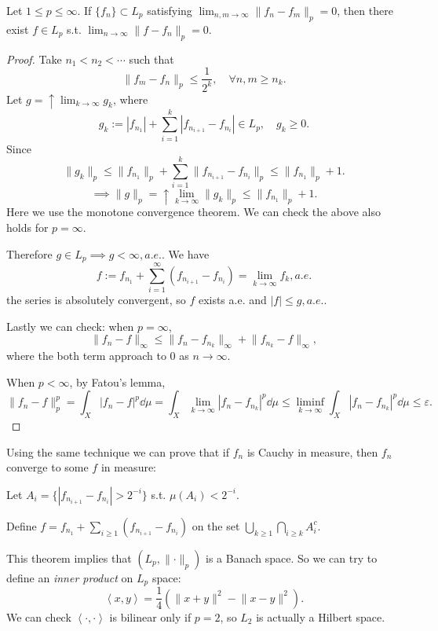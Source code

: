 \begin{theorem}
    Let $1\le p\le \infty$. If $\{f_n\} \subset L_p$ satisfying
	$ \lim_{n,m\to \infty} \lVert f_n - f_m \rVert _p = 0$,
	then there exist $f\in L_p$ s.t.
	$\lim_{n\to \infty} \lVert f - f_n \rVert _p = 0$.
\end{theorem}
\begin{proof}[Proof]
    Take $n_1<n_2<\cdots$ such that
	\[
	\lVert f_m - f_n \rVert _p \le \frac{1}{2^k},\quad \forall n,m\ge n_k.
	\]
	Let $g = \uparrow \lim_{k \to \infty}g_k$, where
	\[
	g_k := |f_{n_1}| + \sum_{i=1}^{k} |f_{n_{i+1}} - f_{n_i}| \in L_p,\quad
	g_k \ge 0.
	\]
	Since
	\[
	\lVert g_k \rVert _p \le \lVert f_{n_1} \rVert _p +
	\sum_{i=1}^{k} \lVert f_{n_{i+1}} - f_{n_i} \rVert _p
	\le \lVert f_{n_1} \rVert _p +1.
	\]
	\[
	\implies \lVert g \rVert _p = \uparrow \lim_{k\to \infty}\lVert g_k \rVert _p
	\le \lVert f_{n_1} \rVert _p + 1.
	\]
	Here we use the monotone convergence theorem.
	We can check the above also holds for $p = \infty$.

	Therefore $g \in L_p\implies g < \infty, a.e.$.
	We have
	\[
	f := f_{n_1} + \sum_{i=1}^{\infty} (f_{n_{i+1}} - f_{n_i})
	= \lim_{k \to \infty} f_k, a.e.
	\]
	the series is absolutely convergent, so $f$ exists a.e. and $|f| \le g,a.e.$.

	Lastly we can check:
	when $p = \infty$,
	\[
	\lVert f_n - f \rVert _\infty \le \lVert f_n - f_{n_k} \rVert _\infty
	+ \lVert f_{n_k} - f \rVert _\infty,
	\]
	where the both term approach to 0 as $n\to \infty$.

	When $p < \infty$, by Fatou's lemma,
	\[
	\lVert f_n - f \rVert _p^p = \int_X |f_n - f|^p\dd\mu
	= \int_X \lim_{k\to \infty}|f_n - f_{n_k}|^p\dd \mu
	\le \liminf_{k\to \infty} \int_X |f_n - f_{n_k}|^p\dd \mu \le \varepsilon.
	\]
\end{proof}

\begin{remark}
    Using the same technique we can prove that if $f_n$ is Cauchy in measure,
	then $f_n$ converge to some $f$ in measure:

	Let $A_i = \{|f_{n_{i+1}} - f_{n_i}|>2^{-i}\}$ s.t. $\mu(A_i) < 2^{-i}$.

	Define $f = f_{n_1}+\sum_{i\ge 1}(f_{n_{i+1}} - f_{n_i})$ on the
	set $\bigcup_{k\ge 1}\bigcap_{i\ge k} A_i^c$.
\end{remark}

This theorem implies that $(L_p, \lVert \cdot \rVert _p)$ is a Banach space.
So we can try to define an \textit{inner product} on $L_p$ space:
\[
\left<x, y\right> = \frac{1}{4} (\lVert x+y \rVert ^2 - \lVert x-y \rVert ^2).
\]
We can check $ \left<\cdot, \cdot \right>$ is bilinear only if $p = 2$,
so $L_2$ is actually a Hilbert space.


